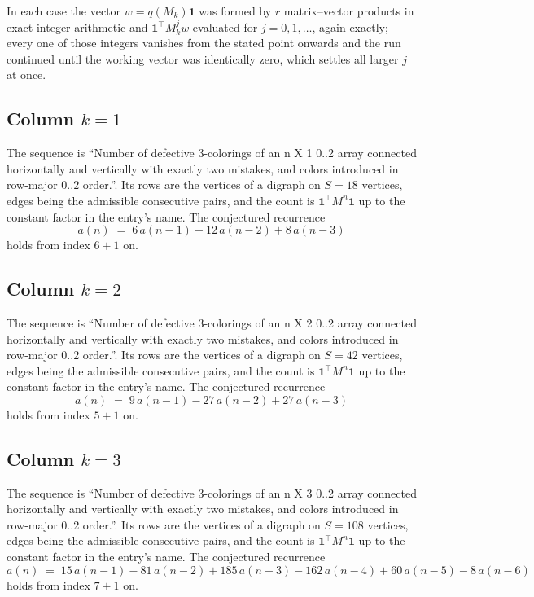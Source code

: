 \documentclass[11pt,a4paper]{article}
\theoremstyle{plain}
\theoremstyle{definition}
\begin{document}
In each case the vector $w=q(M_k)\mathbf{1}$ was formed by $r$ matrix--vector products in
exact integer arithmetic and $\mathbf{1}^{\!\top}M_k^{j}w$ evaluated for $j=0,1,\dots$,
again exactly; every one of those integers vanishes from the stated point onwards and the run
continued until the working vector was identically zero, which settles all larger $j$ at once.

\subsection*{Column $k$$=1$}
The sequence is ``Number of defective 3-colorings of an n X 1 0..2 array connected horizontally and vertically with exactly two mistakes, and colors introduced in row-major 0..2 order.''. Its rows are the vertices of a digraph on
$S=18$ vertices, edges being the admissible consecutive pairs, and the count is
$\mathbf{1}^{\!\top}M^{n}\mathbf{1}$ up to the constant factor in the entry's name.
The conjectured recurrence
\[
a(n)\;=\;6\,a(n-1) - 12\,a(n-2) + 8\,a(n-3)
\]
holds from index $6+1$ on.

\subsection*{Column $k$$=2$}
The sequence is ``Number of defective 3-colorings of an n X 2 0..2 array connected horizontally and vertically with exactly two mistakes, and colors introduced in row-major 0..2 order.''. Its rows are the vertices of a digraph on
$S=42$ vertices, edges being the admissible consecutive pairs, and the count is
$\mathbf{1}^{\!\top}M^{n}\mathbf{1}$ up to the constant factor in the entry's name.
The conjectured recurrence
\[
a(n)\;=\;9\,a(n-1) - 27\,a(n-2) + 27\,a(n-3)
\]
holds from index $5+1$ on.

\subsection*{Column $k$$=3$}
The sequence is ``Number of defective 3-colorings of an n X 3 0..2 array connected horizontally and vertically with exactly two mistakes, and colors introduced in row-major 0..2 order.''. Its rows are the vertices of a digraph on
$S=108$ vertices, edges being the admissible consecutive pairs, and the count is
$\mathbf{1}^{\!\top}M^{n}\mathbf{1}$ up to the constant factor in the entry's name.
The conjectured recurrence
\[
a(n)\;=\;15\,a(n-1) - 81\,a(n-2) + 185\,a(n-3) - 162\,a(n-4) + 60\,a(n-5) - 8\,a(n-6)
\]
holds from index $7+1$ on.
\end{document}

